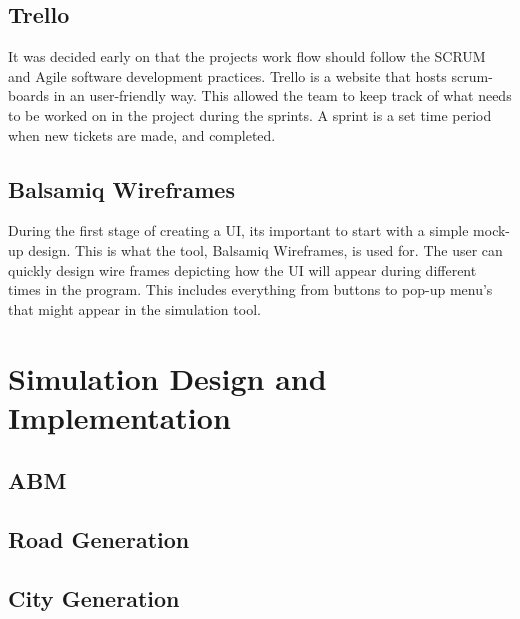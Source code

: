 \subsection{Trello}

It was decided early on that the projects work flow should follow the SCRUM and Agile software development practices. Trello is a website that hosts scrum-boards in an user-friendly way. This allowed the team to keep track of what needs to be worked on in the project during the sprints. A sprint is a set time period when new tickets are made, and completed.

\subsection{Balsamiq Wireframes}

During the first stage of creating a UI, its important to start with a simple mock-up design. This is what the tool, Balsamiq Wireframes, is used for. The user can quickly design wire frames depicting how the UI will appear during different times in the program. This includes everything from buttons to pop-up menu's that might appear in the simulation tool.

\section{Simulation Design and Implementation}

\subsection{ABM}

\subsection{Road Generation}

\subsection{City Generation}

